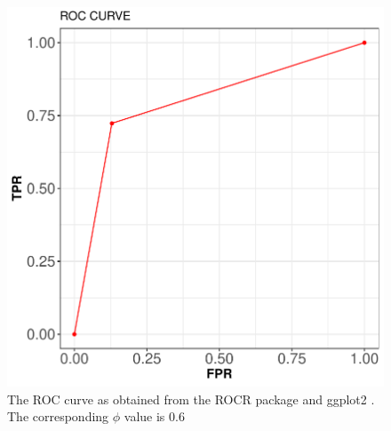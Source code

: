 \documentclass[12pt,%
               a4paper,%
               oneside,openany,%
               titlepage,%
               headinclude,footinclude,%
               BCOR5mm,%
               cleardoublepage=empty,%
               tablecaptionabove,%
               floatperchapter,
               ]{scrreprt}                 %
\begin{document}
\begin{figure}[h]
\begin{center}
\includegraphics[width=1\textwidth]{Figures/ROC_mgm.pdf}
\caption{The ROC curve as obtained from the ROCR package \cite{sing2005rocr} and ggplot2 \cite{ggplot2}. The corresponding $\phi$ value is $0.6$ } 
\label{ROC_mgm}
\end{center}
\end{figure}
\end{document}

